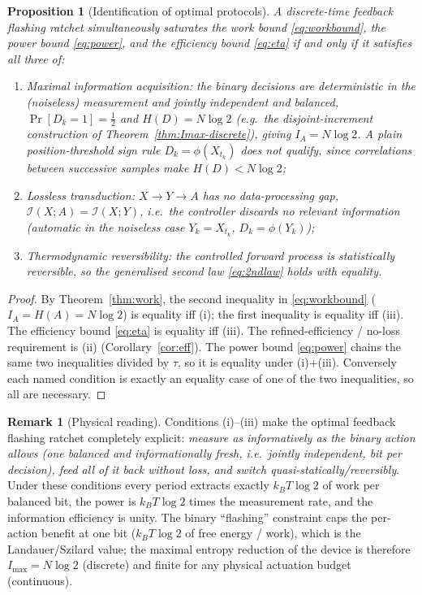 \documentclass{amsart}
\newtheorem{proposition}{Proposition}
\theoremstyle{definition}
\newtheorem{remark}{Remark}
\newcommand{\kB}{k_{B}}
\begin{document}
\begin{proposition}[Identification of optimal protocols]\label{prop:opt}
A discrete-time feedback flashing ratchet simultaneously saturates the
work bound \eqref{eq:workbound}, the power bound \eqref{eq:power}, and the
efficiency bound \eqref{eq:eta} if and only if it satisfies all three of:
\begin{enumerate}
\item[\textup{(i)}] \emph{Maximal information acquisition}: the binary decisions
are deterministic in the (noiseless) measurement and \emph{jointly independent}
and balanced, $\Pr[D_k=1]=\tfrac12$ and $H(D)=N\log2$ (e.g.\ the
disjoint-increment construction of Theorem~\ref{thm:Imax-discrete}), giving
$I_A=N\log2$. \emph{A plain position-threshold sign rule $D_k=\phi(X_{t_k})$
does not qualify}, since correlations between successive samples make
$H(D)<N\log2$;
\item[\textup{(ii)}] \emph{Lossless transduction}: $X\to Y\to A$ has no
data-processing gap, $\mathcal I(X;A)=\mathcal I(X;Y)$, i.e.\ the controller
discards no relevant information (automatic in the noiseless case
$Y_k=X_{t_k}$, $D_k=\phi(Y_k)$);
\item[\textup{(iii)}] \emph{Thermodynamic reversibility}: the controlled forward
process is statistically reversible, so the generalised second law
\eqref{eq:2ndlaw} holds with equality.
\end{enumerate}
\end{proposition}

\begin{proof}
By Theorem~\ref{thm:work}, the second inequality in \eqref{eq:workbound}
($I_A=H(A)=N\log2$) is equality iff (i); the first inequality is equality iff
(iii). The efficiency bound \eqref{eq:eta} is equality iff (iii). The
refined-efficiency / no-loss requirement is (ii) (Corollary~\ref{cor:eff}).
The power bound \eqref{eq:power} chains the same two inequalities divided by
$\tau$, so it is equality under (i)+(iii). Conversely each named condition is
exactly an equality case of one of the two inequalities, so all are necessary.
\end{proof}

\begin{remark}[Physical reading]
Conditions (i)--(iii) make the optimal feedback flashing ratchet completely
explicit: \emph{measure as informatively as the binary action allows (one
balanced \emph{and informationally fresh}, i.e.\ jointly independent, bit per
decision), feed all of it back without loss, and switch
quasi-statically/reversibly}. Under these conditions every period extracts
exactly $\kB T\log2$ of work per balanced bit, the power is $\kB T\log2$ times
the measurement rate, and the information efficiency is unity. The binary
``flashing'' constraint caps the per-action benefit at one bit
($\kB T\log2$ of free energy / work), which is the Landauer/Szilard value;
the maximal entropy reduction of the device is therefore $I_{\max}=N\log2$
(discrete) and finite for any physical actuation budget (continuous).
\end{remark}
\end{document}
